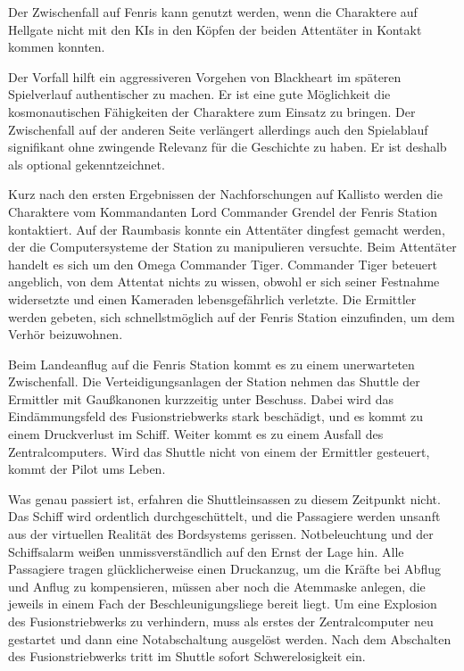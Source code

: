 
Der Zwischenfall auf Fenris kann genutzt werden, wenn die Charaktere auf Hellgate nicht mit den KIs in den Köpfen der beiden Attentäter in Kontakt kommen konnten. 

Der Vorfall hilft ein aggressiveren Vorgehen von Blackheart im späteren Spielverlauf authentischer zu machen. Er ist eine gute Möglichkeit die kosmonautischen Fähigkeiten der Charaktere zum Einsatz zu bringen. Der Zwischenfall auf der anderen Seite verlängert allerdings auch den Spielablauf signifikant ohne zwingende Relevanz für die Geschichte zu haben. Er ist deshalb als optional gekenntzeichnet.

Kurz nach den ersten Ergebnissen der Nachforschungen auf Kallisto werden die Charaktere vom Kommandanten Lord Commander Grendel der Fenris Station kontaktiert. Auf der Raumbasis konnte ein Attentäter dingfest gemacht werden, der die Computersysteme der Station zu manipulieren versuchte. Beim Attentäter handelt es sich um den Omega Commander Tiger. Commander Tiger beteuert angeblich, von dem Attentat nichts zu wissen, obwohl er sich seiner Festnahme widersetzte und einen Kameraden lebensgefährlich verletzte. Die Ermittler werden gebeten, sich schnellstmöglich auf der Fenris Station einzufinden, um dem Verhör beizuwohnen.

Beim Landeanflug auf die Fenris Station kommt es zu einem unerwarteten Zwischenfall. Die Verteidigungsanlagen der Station nehmen das Shuttle der Ermittler mit Gaußkanonen kurzzeitig unter Beschuss. Dabei wird das Eindämmungsfeld des Fusionstriebwerks stark beschädigt, und es kommt zu einem Druckverlust im Schiff. Weiter kommt es zu einem Ausfall des Zentralcomputers. Wird das Shuttle nicht von einem der Ermittler gesteuert, kommt der Pilot ums Leben.

Was genau passiert ist, erfahren die Shuttleinsassen zu diesem Zeitpunkt nicht. Das Schiff wird ordentlich durchgeschüttelt, und die Passagiere werden unsanft aus der virtuellen Realität des Bordsystems gerissen. Notbeleuchtung und der Schiffsalarm weißen unmissverständlich auf den Ernst der Lage hin. Alle Passagiere tragen glücklicherweise einen Druckanzug, um die Kräfte bei Abflug und Anflug zu kompensieren, müssen aber noch die Atemmaske anlegen, die jeweils in einem Fach der Beschleunigungsliege bereit liegt. Um eine Explosion des Fusionstriebwerks zu verhindern, muss als erstes der Zentralcomputer neu gestartet und dann eine Notabschaltung ausgelöst werden. Nach dem Abschalten des Fusionstriebwerks tritt im Shuttle sofort Schwerelosigkeit ein.


